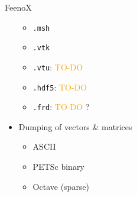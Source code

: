 \documentclass[
  ignorenonframetext,
  aspectratio=169,
]{beamer}
\newcommand{\passthrough}[1]{#1}
\providecommand{\tightlist}{%
  \setlength{\itemsep}{0pt}\setlength{\parskip}{0pt}}
\begin{document}
\begin{frame}[fragile]{}
\begin{columns}[T]
\begin{column}{0.5\textwidth}
\begin{exampleblock}{FeenoX}
\begin{itemize}
  \begin{itemize}
  \tightlist
  \item
    \passthrough{\lstinline!.msh!}
  \item
    \passthrough{\lstinline!.vtk!}
  \item
    \passthrough{\lstinline!.vtu!}: \textcolor{Orange}{TO-DO}
  \item
    \passthrough{\lstinline!.hdf5!}: \textcolor{Orange}{TO-DO}
  \item
    \passthrough{\lstinline!.frd!}: \textcolor{Orange}{TO-DO} ?
  \end{itemize}
\item
  Dumping of vectors \& matrices

  \begin{itemize}
  \tightlist
  \item
    ASCII
  \item
    PETSc binary
  \item
    Octave (sparse)
  \end{itemize}
\end{itemize}
\end{exampleblock}
\end{column}
\end{columns}
\end{frame}
\end{document}
